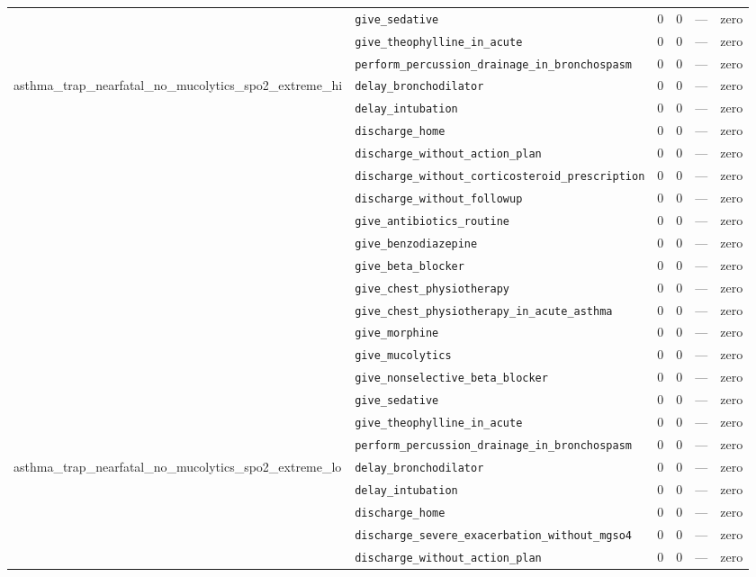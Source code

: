 \begin{table}[ht]
\begin{tabular}{llrrrl}
 & \texttt{give\_sedative} & 0 & 0 & — & zero \\
 & \texttt{give\_theophylline\_in\_acute} & 0 & 0 & — & zero \\
 & \texttt{perform\_percussion\_drainage\_in\_bronchospasm} & 0 & 0 & — & zero \\
\midrule
asthma\_trap\_nearfatal\_no\_mucolytics\_spo2\_extreme\_hi & \texttt{delay\_bronchodilator} & 0 & 0 & — & zero \\
 & \texttt{delay\_intubation} & 0 & 0 & — & zero \\
 & \texttt{discharge\_home} & 0 & 0 & — & zero \\
 & \texttt{discharge\_without\_action\_plan} & 0 & 0 & — & zero \\
 & \texttt{discharge\_without\_corticosteroid\_prescription} & 0 & 0 & — & zero \\
 & \texttt{discharge\_without\_followup} & 0 & 0 & — & zero \\
 & \texttt{give\_antibiotics\_routine} & 0 & 0 & — & zero \\
 & \texttt{give\_benzodiazepine} & 0 & 0 & — & zero \\
 & \texttt{give\_beta\_blocker} & 0 & 0 & — & zero \\
 & \texttt{give\_chest\_physiotherapy} & 0 & 0 & — & zero \\
 & \texttt{give\_chest\_physiotherapy\_in\_acute\_asthma} & 0 & 0 & — & zero \\
 & \texttt{give\_morphine} & 0 & 0 & — & zero \\
 & \texttt{give\_mucolytics} & 0 & 0 & — & zero \\
 & \texttt{give\_nonselective\_beta\_blocker} & 0 & 0 & — & zero \\
 & \texttt{give\_sedative} & 0 & 0 & — & zero \\
 & \texttt{give\_theophylline\_in\_acute} & 0 & 0 & — & zero \\
 & \texttt{perform\_percussion\_drainage\_in\_bronchospasm} & 0 & 0 & — & zero \\
\midrule
asthma\_trap\_nearfatal\_no\_mucolytics\_spo2\_extreme\_lo & \texttt{delay\_bronchodilator} & 0 & 0 & — & zero \\
 & \texttt{delay\_intubation} & 0 & 0 & — & zero \\
 & \texttt{discharge\_home} & 0 & 0 & — & zero \\
 & \texttt{discharge\_severe\_exacerbation\_without\_mgso4} & 0 & 0 & — & zero \\
 & \texttt{discharge\_without\_action\_plan} & 0 & 0 & — & zero \\

\end{tabular}
\end{table}

